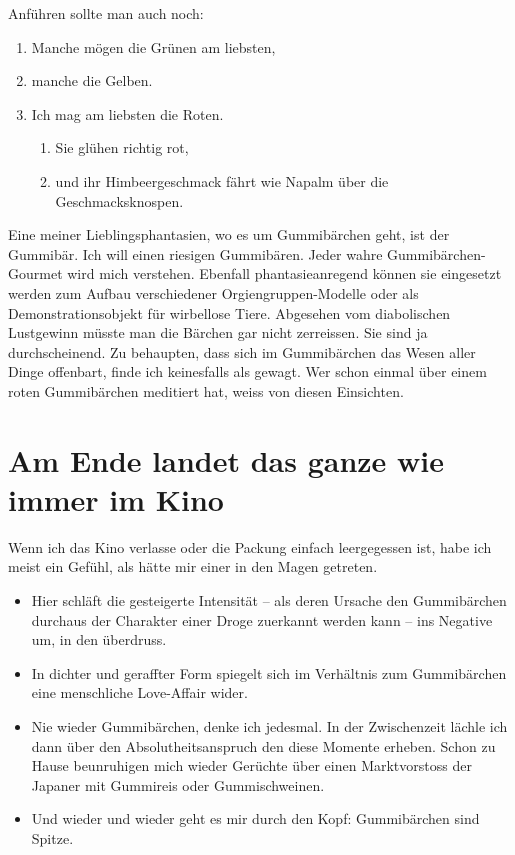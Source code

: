 Anführen sollte man auch noch: 
\begin{enumerate}
  \item Manche mögen die Grünen am liebsten,
  \item manche die Gelben.
  \item Ich mag am liebsten die Roten.
  \begin{enumerate}
    \item Sie glühen richtig rot,
    \item und ihr Himbeergeschmack fährt wie Napalm über die Geschmacksknospen.
  \end{enumerate}
\end{enumerate}
Eine meiner Lieblingsphantasien, wo es um Gummibärchen geht, ist der Gummibär. Ich will einen riesigen Gummibären. Jeder wahre Gummibärchen-Gourmet wird mich verstehen. Ebenfall phantasieanregend können sie eingesetzt werden zum Aufbau verschiedener Orgiengruppen-Modelle oder als Demonstrationsobjekt für wirbellose Tiere. Abgesehen vom diabolischen Lustgewinn müsste man die Bärchen gar nicht zerreissen. Sie sind ja durchscheinend. Zu behaupten, dass sich im Gummibärchen das Wesen aller Dinge offenbart, finde ich keinesfalls als gewagt. Wer schon einmal über einem roten Gummibärchen meditiert hat, weiss von diesen Einsichten.

\section[Im Kino]{Am Ende landet das ganze wie immer im Kino}

Wenn ich das Kino verlasse oder die Packung einfach leergegessen ist, habe ich meist ein Gefühl, als hätte mir einer in den Magen getreten.
\begin{itemize}
  \item Hier schläft die gesteigerte Intensität -- als deren Ursache den Gummibärchen durchaus der Charakter einer Droge zuerkannt werden kann -- ins Negative um, in den überdruss.
  \item In dichter und geraffter Form spiegelt sich im Verhältnis zum Gummibärchen eine menschliche Love-Affair wider.
  \item Nie wieder Gummibärchen, denke ich jedesmal. In der Zwischenzeit lächle ich dann über den Absolutheitsanspruch den diese Momente erheben. Schon zu Hause beunruhigen mich wieder Gerüchte über einen Marktvorstoss der Japaner mit Gummireis oder Gummischweinen.
  \item Und wieder und wieder geht es mir durch den Kopf: Gummibärchen sind Spitze.
\end{itemize}

